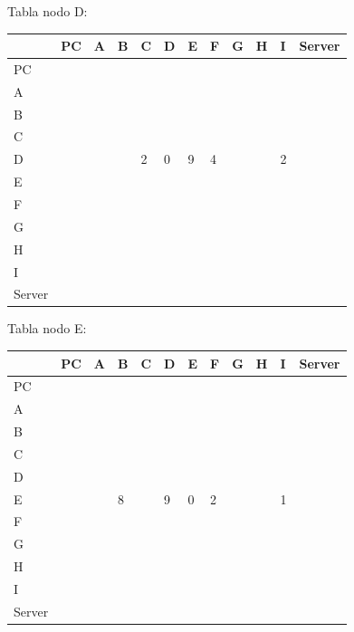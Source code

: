 \documentclass[a4paper]{article}
\begin{document}
\begin{table}[ht]
Tabla nodo D:\\
\begin{tabular}{|l|l|l|l|l|l|l|l|l|l|l|l|}
\hline
       & PC & A & B & C & D & E & F & G & H & I & Server \\ \hline
PC     &    &   &   &   &   &   &   &   &   &   &        \\ \hline
A      &    &   &   &   &   &   &   &   &   &   &        \\ \hline
B      &    &   &   &   &   &   &   &   &   &   &        \\ \hline
C      &    &   &   &   &   &   &   &   &   &   &        \\ \hline
D      &    &   &   & 2 & 0 & 9 & 4 &   &   & 2 &        \\ \hline
E      &    &   &   &   &   &   &   &   &   &   &        \\ \hline
F      &    &   &   &   &   &   &   &   &   &   &        \\ \hline
G      &    &   &   &   &   &   &   &   &   &   &        \\ \hline
H      &    &   &   &   &   &   &   &   &   &   &        \\ \hline
I      &    &   &   &   &   &   &   &   &   &   &        \\ \hline
Server &    &   &   &   &   &   &   &   &   &   &        \\ \hline
\end{tabular}
\end{table}



\begin{table}[ht]
Tabla nodo E:\\
\begin{tabular}{|l|l|l|l|l|l|l|l|l|l|l|l|}
\hline
       & PC & A & B & C & D & E & F & G & H & I & Server \\ \hline
PC     &    &   &   &   &   &   &   &   &   &   &        \\ \hline
A      &    &   &   &   &   &   &   &   &   &   &        \\ \hline
B      &    &   &   &   &   &   &   &   &   &   &        \\ \hline
C      &    &   &   &   &   &   &   &   &   &   &        \\ \hline
D      &    &   &   &   &   &   &   &   &   &   &        \\ \hline
E      &    &   & 8 &   & 9 & 0 & 2 &   &   & 1 &        \\ \hline
F      &    &   &   &   &   &   &   &   &   &   &        \\ \hline
G      &    &   &   &   &   &   &   &   &   &   &        \\ \hline
H      &    &   &   &   &   &   &   &   &   &   &        \\ \hline
I      &    &   &   &   &   &   &   &   &   &   &        \\ \hline
Server &    &   &   &   &   &   &   &   &   &   &        \\ \hline
\end{tabular}
\end{table}
\clearpage
\end{document}
